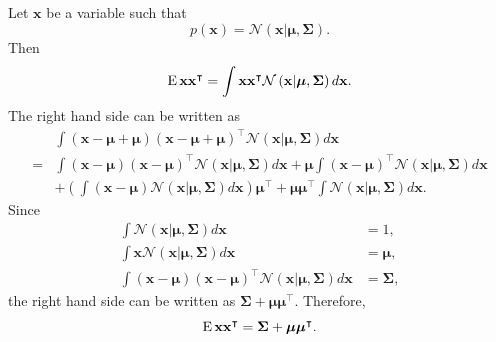 \subsection{}
\label{2.35}
Let $\mathbf{x}$ be a variable such that
%
\begin{equation}
p(\mathbf{x})
=
\mathcal{N}
\left(
	\mathbf{x}
	|
	\bm{\mu},
	\bm{\Sigma}
\right).
\end{equation}
%
Then
%
\begin{equation}
\operatorname{E} \mathbf{x} \mathbf{x} ^ \intercal
=
\int 
\mathbf{x} \mathbf{x} ^ \intercal
\mathcal{N}
\left(
	\mathbf{x}
	|
	\bm{\mu},
	\bm{\Sigma}
\right)
d\mathbf{x}.
\end{equation}
%
The right hand side can be written as
%
\begin{equation}
\begin{aligned}
&\int 
(\mathbf{x} - \bm{\mu} + \bm{\mu}) 
(\mathbf{x} - \bm{\mu} + \bm{\mu}) ^ \intercal
\mathcal{N}
\left(
	\mathbf{x}
	|
	\bm{\mu},
	\bm{\Sigma}
\right)
d\mathbf{x} \\
=&
\int 
(\mathbf{x} - \bm{\mu}) 
(\mathbf{x} - \bm{\mu}) ^ \intercal
\mathcal{N}
\left(
	\mathbf{x}
	|
	\bm{\mu},
	\bm{\Sigma}
\right)
d\mathbf{x}
+
\bm{\mu}
\int 
(\mathbf{x} - \bm{\mu}) ^ \intercal
\mathcal{N}
\left(
	\mathbf{x}
	|
	\bm{\mu},
	\bm{\Sigma}
\right)
d\mathbf{x} 
\\
&+
\left(
	\int
	(\mathbf{x} - \bm{\mu})
	\mathcal{N}
	\left(
		\mathbf{x}
		|
		\bm{\mu},
		\bm{\Sigma}
	\right)
	d\mathbf{x}
\right)
\bm{\mu} ^ \intercal
+
\bm{\mu} 
\bm{\mu} ^ \intercal
\int 
\mathcal{N}
\left(
	\mathbf{x}
	|
	\bm{\mu},
	\bm{\Sigma}
\right)
d\mathbf{x}.
\end{aligned}
\end{equation}
%
Since
%
\begin{equation}
\begin{aligned}
\int 
\mathcal{N}
\left(
	\mathbf{x}
	|
	\bm{\mu},
	\bm{\Sigma}
\right)
d\mathbf{x}
&=
1, 
\\
\int 
\mathbf{x}
\mathcal{N}
\left(
	\mathbf{x}
	|
	\bm{\mu},
	\bm{\Sigma}
\right)
d\mathbf{x}
&=
\bm{\mu},
\\
\int 
(\mathbf{x} - \bm{\mu}) 
(\mathbf{x} - \bm{\mu}) ^ \intercal
\mathcal{N}
\left(
	\mathbf{x}
	|
	\bm{\mu},
	\bm{\Sigma}
\right)
d\mathbf{x}
&=
\bm{\Sigma},
\end{aligned}
\end{equation}
%
the right hand side can be written as $\bm{\Sigma} + \bm{\mu} \bm{\mu} ^ \intercal$.
Therefore,
%
\begin{equation}
\operatorname{E} \mathbf{x} \mathbf{x} ^ \intercal
=
\bm{\Sigma} 
+ 
\bm{\mu} 
\bm{\mu} ^ \intercal.
\end{equation}
%

